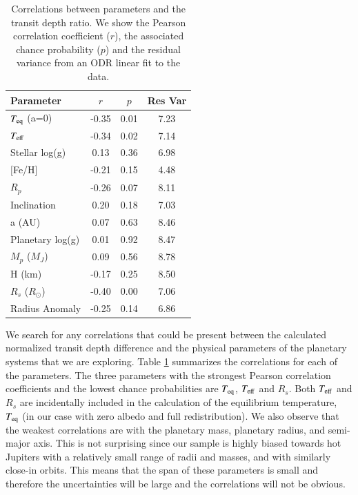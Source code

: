 \begin{table}
    \caption{Correlations between parameters and the transit depth ratio. We show the Pearson correlation coefficient ($r$), the associated chance probability ($p$) and the residual variance from an ODR linear fit to the data. }
    \label{P1:tab:pearson}
    \centering
\begin{tabular}{lccc}
\hline\hline
Parameter &  $r$ &  $p$ &  Res Var \\
\hline
$T_{\rm eq}$ (a=0)      &                            -0.35 &            0.01 &               7.23 \\
$T_{\rm eff}$           &                            -0.34 &            0.02 &               7.14 \\
Stellar log(g)          &                             0.13 &            0.36 &               6.98 \\
$[$Fe/H$]$  &                            -0.21 &            0.15 &               4.48 \\
$R_p$              &                            -0.26 &            0.07 &               8.11 \\
Inclination            &                             0.20 &            0.18 &               7.03 \\
a (AU)         &                             0.07 &            0.63 &               8.46 \\
Planetary log(g)          &                             0.01 &            0.92 &               8.47 \\
$M_p$ ($M_J$)      &                             0.09 &            0.56 &               8.78 \\
H (km)             &                            -0.17 &            0.25 &               8.50 \\
$R_s$ ($R_{\odot}$)      &                            -0.40 &            0.00 &               7.06 \\
Radius Anomaly &                            -0.25 &            0.14 &               6.86 \\
\hline
\end{tabular}
\end{table}


We search for any correlations that could be present between the calculated normalized transit depth difference and the physical parameters of the planetary systems that we are exploring. Table \ref{P1:tab:pearson} summarizes the correlations for each of the parameters. The three parameters with the strongest Pearson correlation coefficients and the lowest chance probabilities are $T_{\rm eq}$, $T_{\rm eff}$ and $R_s$. Both $T_{\rm eff}$ and $R_s$ are incidentally included in the calculation of the equilibrium temperature, $T_{\rm eq}$ (in our case with zero albedo and full redistribution). We also observe that the weakest correlations are with the planetary mass, planetary radius, and semi-major axis. This is not surprising since our sample is highly biased towards hot Jupiters with a relatively small range of radii and masses, and with similarly close-in orbits. This means that the span of these parameters is small and therefore the uncertainties will be large and the correlations will not be obvious.

